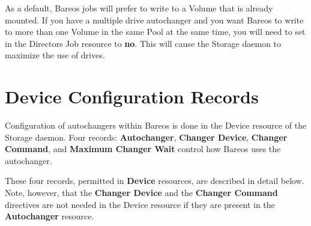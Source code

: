 As a default, Bareos jobs will prefer to write to a Volume that is
already mounted. If you have a multiple drive autochanger and you want
Bareos to write to more than one Volume in the same Pool at the same
time, you will need to set 
in the Directors Job resource to {\bf no}. This will cause
the Storage daemon to maximize the use of drives.


\label{ConfigRecords}
\section{Device Configuration Records}

Configuration of autochangers within Bareos is done in the Device resource of
the Storage daemon. Four records: {\bf Autochanger}, {\bf Changer Device},
{\bf Changer Command}, and {\bf Maximum Changer Wait} control how Bareos uses
the autochanger.

These four records, permitted in {\bf Device} resources, are described in
detail below. Note, however, that the {\bf Changer Device} and the
{\bf Changer Command} directives are not needed in the Device resource
if they are present in the {\bf Autochanger} resource.

